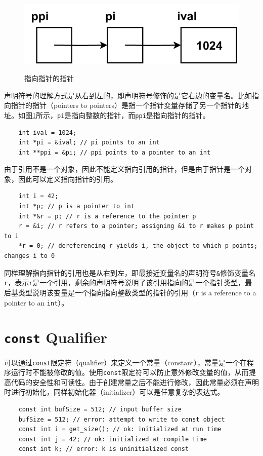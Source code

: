 \begin{figure}[!htb]
    \centering
    \includegraphics[width=0.3\linewidth]{images/pointer2pointer.pdf}\\
    \caption{指向指针的指针}\label{fig:cpp-pointer2pointer}
\end{figure}

声明符号的理解方式是从右到左的，即声明符号修饰的是它右边的变量名。比如指向指针的指针（pointers to pointers）是指一个指针变量存储了另一个指针的地址。如图\ref{fig:cpp-pointer2pointer}所示，\texttt{pi}是指向整数的指针，而\texttt{ppi}是指向指针的指针。

\begin{verbatim}
    int ival = 1024;
    int *pi = &ival; // pi points to an int
    int **ppi = &pi; // ppi points to a pointer to an int
\end{verbatim}

由于引用不是一个对象，因此不能定义指向引用的指针，但是由于指针是一个对象，因此可以定义指向指针的引用。

\begin{verbatim}
    int i = 42;
    int *p; // p is a pointer to int
    int *&r = p; // r is a reference to the pointer p
    r = &i; // r refers to a pointer; assigning &i to r makes p point to i
    *r = 0; // dereferencing r yields i, the object to which p points; changes i to 0
\end{verbatim}

同样理解指向指针的引用也是从右到左，即最接近变量名的声明符号\texttt{&}修饰变量名\texttt{r}，表示\texttt{r}是一个引用，剩余的声明符号说明了该引用指向的是一个指针类型，最后基类型说明该变量是一个指向指向整数类型的指针的引用（\texttt{r} is a reference to a pointer to an \texttt{int}）。

\section{\texttt{const} Qualifier}
可以通过\texttt{const}限定符（qualifier）来定义一个常量（constant），常量是一个在程序运行时不能被修改的值。使用\texttt{const}限定符可以防止意外修改变量的值，从而提高代码的安全性和可读性。由于创建常量之后不能进行修改，因此常量必须在声明时进行初始化，同样初始化器（initializer）可以是任意复杂的表达式。

\begin{verbatim}
    const int bufSize = 512; // input buffer size
    bufSize = 512; // error: attempt to write to const object
    const int i = get_size(); // ok: initialized at run time
    const int j = 42; // ok: initialized at compile time
    const int k; // error: k is uninitialized const
\end{verbatim}

